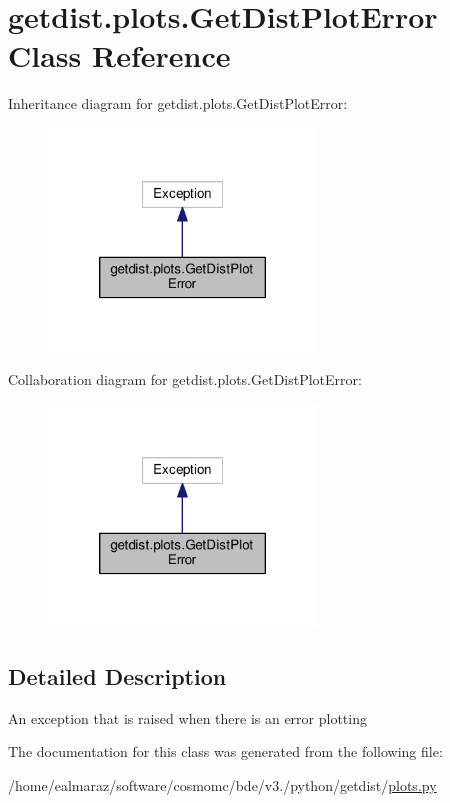 \hypertarget{classgetdist_1_1plots_1_1GetDistPlotError}{}\section{getdist.\+plots.\+Get\+Dist\+Plot\+Error Class Reference}
\label{classgetdist_1_1plots_1_1GetDistPlotError}


Inheritance diagram for getdist.\+plots.\+Get\+Dist\+Plot\+Error\+:
\nopagebreak
\begin{figure}[H]
\begin{center}
\leavevmode
\includegraphics[width=202pt]{classgetdist_1_1plots_1_1GetDistPlotError__inherit__graph}
\end{center}
\end{figure}


Collaboration diagram for getdist.\+plots.\+Get\+Dist\+Plot\+Error\+:
\nopagebreak
\begin{figure}[H]
\begin{center}
\leavevmode
\includegraphics[width=202pt]{classgetdist_1_1plots_1_1GetDistPlotError__coll__graph}
\end{center}
\end{figure}


\subsection{Detailed Description}
\begin{DoxyVerb}An exception that is raised when there is an error plotting
\end{DoxyVerb}
 

The documentation for this class was generated from the following file\+:\begin{DoxyCompactItemize}
\item 
/home/ealmaraz/software/cosmomc/bde/v3./python/getdist/\mbox{\hyperlink{plots_8py}{plots.\+py}}\end{DoxyCompactItemize}
